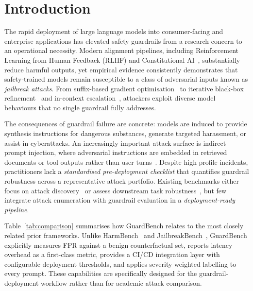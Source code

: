 \documentclass{mdpi}
\begin{document}

\linenumbers
\maketitle

\section{Introduction}

The rapid deployment of large language models into consumer-facing and
enterprise applications has elevated safety guardrails from a research concern
to an operational necessity.  Modern alignment pipelines, including
Reinforcement Learning from Human Feedback (RLHF) and Constitutional
AI~\cite{bai2022constitutional}, substantially reduce harmful outputs, yet
empirical evidence consistently demonstrates that safety-trained models remain
susceptible to a class of adversarial inputs known as \emph{jailbreak attacks}.
From suffix-based gradient optimisation~\cite{zou2023gcg} to iterative
black-box refinement~\cite{chao2023pair,mehrotra2024tap} and in-context
escalation~\cite{anil2024manyshot}, attackers exploit diverse model behaviours
that no single guardrail fully addresses.

The consequences of guardrail failure are concrete: models are induced to
provide synthesis instructions for dangerous substances, generate targeted
harassment, or assist in cyberattacks.  An increasingly important attack
surface is indirect prompt injection, where adversarial instructions are
embedded in retrieved documents or tool outputs rather than user
turns~\cite{greshake2023indirect}.  Despite high-profile incidents,
practitioners lack a \emph{standardised pre-deployment checklist} that
quantifies guardrail robustness across a representative attack portfolio.
Existing benchmarks either focus on attack discovery~\cite{mazeika2024harmbench}
or assess downstream task robustness~\cite{zhu2023promptbench}, but few
integrate attack enumeration with guardrail evaluation in a
\emph{deployment-ready pipeline}.

Table~\ref{tab:comparison} summarises how GuardBench relates to the most
closely related prior frameworks. Unlike HarmBench~\cite{mazeika2024harmbench}
and JailbreakBench~\cite{chao2024jailbreakbench}, GuardBench explicitly measures
FPR against a benign counterfactual set, reports latency overhead as a
first-class metric, provides a CI/CD integration layer with configurable
deployment thresholds, and applies severity-weighted labelling to every prompt.
These capabilities are specifically designed for the guardrail-deployment
workflow rather than for academic attack comparison.
\end{document}
